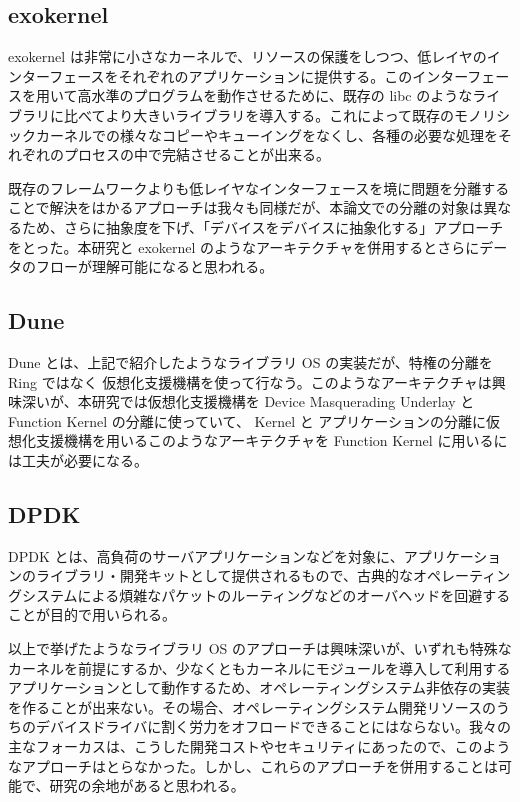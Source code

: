 \documentclass[a4paper,11pt,report]{ltjsbook}
\begin{document}
\subsection{exokernel}

exokernel\cite{exokernel} は非常に小さなカーネルで、リソースの保護をしつつ、低レイヤのインターフェースをそれぞれのアプリケーションに提供する。このインターフェースを用いて高水準のプログラムを動作させるために、既存の libc のようなライブラリに比べてより大きいライブラリを導入する。これによって既存のモノリシックカーネルでの様々なコピーやキューイングをなくし、各種の必要な処理をそれぞれのプロセスの中で完結させることが出来る。

既存のフレームワークよりも低レイヤなインターフェースを境に問題を分離することで解決をはかるアプローチは我々も同様だが、本論文での分離の対象は異なるため、さらに抽象度を下げ、「デバイスをデバイスに抽象化する」アプローチをとった。本研究と exokernel のようなアーキテクチャを併用するとさらにデータのフローが理解可能になると思われる。

\subsection{Dune}

Dune\cite{dune} とは、上記で紹介したようなライブラリ OS の実装だが、特権の分離を Ring ではなく 仮想化支援機構を使って行なう。このようなアーキテクチャは興味深いが、本研究では仮想化支援機構を Device Masquerading Underlay と Function Kernel の分離に使っていて、 Kernel と アプリケーションの分離に仮想化支援機構を用いるこのようなアーキテクチャを Function Kernel に用いるには工夫が必要になる。

\subsection{DPDK}

DPDK とは、高負荷のサーバアプリケーションなどを対象に、アプリケーションのライブラリ・開発キットとして提供されるもので、古典的なオペレーティングシステムによる煩雑なパケットのルーティングなどのオーバヘッドを回避することが目的で用いられる。

以上で挙げたようなライブラリ OS のアプローチは興味深いが、いずれも特殊なカーネルを前提にするか、少なくともカーネルにモジュールを導入して利用するアプリケーションとして動作するため、オペレーティングシステム非依存の実装を作ることが出来ない。その場合、オペレーティングシステム開発リソースのうちのデバイスドライバに割く労力をオフロードできることにはならない。我々の主なフォーカスは、こうした開発コストやセキュリティにあったので、このようなアプローチはとらなかった。しかし、これらのアプローチを併用することは可能で、研究の余地があると思われる。
\end{document}

